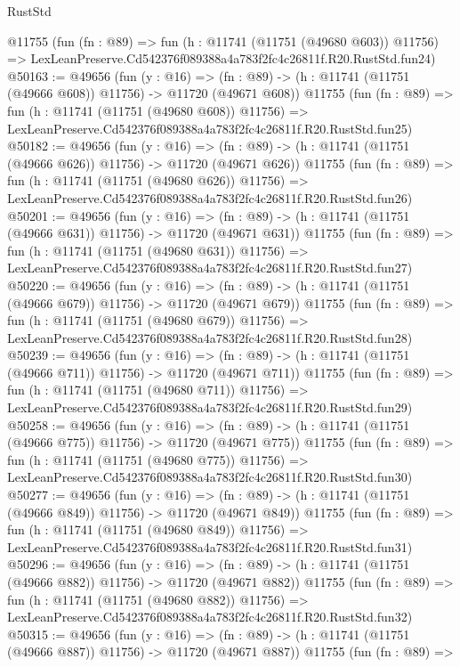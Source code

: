 \begin{lexlean}{RustStd}
\begin{coremodule}
    @11755
    (fun (fn : @89) =>
    fun (h : @11741 (@11751 (@49680 @603)) @11756) =>
    LexLeanPreserve.Cd542376f089388a4a783f2fc4c26811f.R20.RustStd.fun24)
@50163 := @49656
    (fun (y : @16) =>
    (fn : @89) -> (h : @11741 (@11751 (@49666 @608)) @11756) -> @11720 (@49671 @608))
    @11755
    (fun (fn : @89) =>
    fun (h : @11741 (@11751 (@49680 @608)) @11756) =>
    LexLeanPreserve.Cd542376f089388a4a783f2fc4c26811f.R20.RustStd.fun25)
@50182 := @49656
    (fun (y : @16) =>
    (fn : @89) -> (h : @11741 (@11751 (@49666 @626)) @11756) -> @11720 (@49671 @626))
    @11755
    (fun (fn : @89) =>
    fun (h : @11741 (@11751 (@49680 @626)) @11756) =>
    LexLeanPreserve.Cd542376f089388a4a783f2fc4c26811f.R20.RustStd.fun26)
@50201 := @49656
    (fun (y : @16) =>
    (fn : @89) -> (h : @11741 (@11751 (@49666 @631)) @11756) -> @11720 (@49671 @631))
    @11755
    (fun (fn : @89) =>
    fun (h : @11741 (@11751 (@49680 @631)) @11756) =>
    LexLeanPreserve.Cd542376f089388a4a783f2fc4c26811f.R20.RustStd.fun27)
@50220 := @49656
    (fun (y : @16) =>
    (fn : @89) -> (h : @11741 (@11751 (@49666 @679)) @11756) -> @11720 (@49671 @679))
    @11755
    (fun (fn : @89) =>
    fun (h : @11741 (@11751 (@49680 @679)) @11756) =>
    LexLeanPreserve.Cd542376f089388a4a783f2fc4c26811f.R20.RustStd.fun28)
@50239 := @49656
    (fun (y : @16) =>
    (fn : @89) -> (h : @11741 (@11751 (@49666 @711)) @11756) -> @11720 (@49671 @711))
    @11755
    (fun (fn : @89) =>
    fun (h : @11741 (@11751 (@49680 @711)) @11756) =>
    LexLeanPreserve.Cd542376f089388a4a783f2fc4c26811f.R20.RustStd.fun29)
@50258 := @49656
    (fun (y : @16) =>
    (fn : @89) -> (h : @11741 (@11751 (@49666 @775)) @11756) -> @11720 (@49671 @775))
    @11755
    (fun (fn : @89) =>
    fun (h : @11741 (@11751 (@49680 @775)) @11756) =>
    LexLeanPreserve.Cd542376f089388a4a783f2fc4c26811f.R20.RustStd.fun30)
@50277 := @49656
    (fun (y : @16) =>
    (fn : @89) -> (h : @11741 (@11751 (@49666 @849)) @11756) -> @11720 (@49671 @849))
    @11755
    (fun (fn : @89) =>
    fun (h : @11741 (@11751 (@49680 @849)) @11756) =>
    LexLeanPreserve.Cd542376f089388a4a783f2fc4c26811f.R20.RustStd.fun31)
@50296 := @49656
    (fun (y : @16) =>
    (fn : @89) -> (h : @11741 (@11751 (@49666 @882)) @11756) -> @11720 (@49671 @882))
    @11755
    (fun (fn : @89) =>
    fun (h : @11741 (@11751 (@49680 @882)) @11756) =>
    LexLeanPreserve.Cd542376f089388a4a783f2fc4c26811f.R20.RustStd.fun32)
@50315 := @49656
    (fun (y : @16) =>
    (fn : @89) -> (h : @11741 (@11751 (@49666 @887)) @11756) -> @11720 (@49671 @887))
    @11755
    (fun (fn : @89) =>

\end{coremodule}
\end{lexlean}
